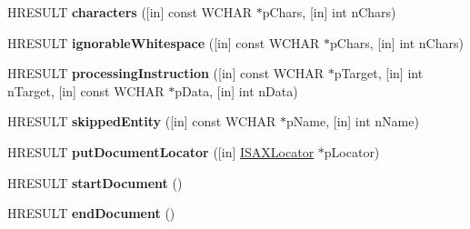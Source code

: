\begin{DoxyCompactItemize}
\item 
\mbox{\label{interface_m_s_x_m_l2_1_1_i_s_a_x_content_handler_a214ac446e1ccb60654436865920cf5df}} 
H\+R\+E\+S\+U\+LT {\bfseries characters} (\mbox{[}in\mbox{]} const W\+C\+H\+AR $\ast$p\+Chars, \mbox{[}in\mbox{]} int n\+Chars)
\item 
\mbox{\label{interface_m_s_x_m_l2_1_1_i_s_a_x_content_handler_a231a97139131cdd6d2b2873b7efc240b}} 
H\+R\+E\+S\+U\+LT {\bfseries ignorable\+Whitespace} (\mbox{[}in\mbox{]} const W\+C\+H\+AR $\ast$p\+Chars, \mbox{[}in\mbox{]} int n\+Chars)
\item 
\mbox{\label{interface_m_s_x_m_l2_1_1_i_s_a_x_content_handler_a1590f2579019195a60a47b6d699c1755}} 
H\+R\+E\+S\+U\+LT {\bfseries processing\+Instruction} (\mbox{[}in\mbox{]} const W\+C\+H\+AR $\ast$p\+Target, \mbox{[}in\mbox{]} int n\+Target, \mbox{[}in\mbox{]} const W\+C\+H\+AR $\ast$p\+Data, \mbox{[}in\mbox{]} int n\+Data)
\item 
\mbox{\label{interface_m_s_x_m_l2_1_1_i_s_a_x_content_handler_a9af221d80d179945179ee23a2d620e09}} 
H\+R\+E\+S\+U\+LT {\bfseries skipped\+Entity} (\mbox{[}in\mbox{]} const W\+C\+H\+AR $\ast$p\+Name, \mbox{[}in\mbox{]} int n\+Name)
\item 
\mbox{\label{interface_m_s_x_m_l2_1_1_i_s_a_x_content_handler_a0d24811b770d414786d4055913923d3d}} 
H\+R\+E\+S\+U\+LT {\bfseries put\+Document\+Locator} (\mbox{[}in\mbox{]} \hyperlink{interface_m_s_x_m_l2_1_1_i_s_a_x_locator}{I\+S\+A\+X\+Locator} $\ast$p\+Locator)
\item 
\mbox{\label{interface_m_s_x_m_l2_1_1_i_s_a_x_content_handler_a97b4a41e9d18c71dcb60e09fc2582e5d}} 
H\+R\+E\+S\+U\+LT {\bfseries start\+Document} ()
\item 
\mbox{\label{interface_m_s_x_m_l2_1_1_i_s_a_x_content_handler_a16cbfe414cee7b6d4e5da68de807078e}} 
H\+R\+E\+S\+U\+LT {\bfseries end\+Document} ()
\item 

\end{DoxyCompactItemize}
